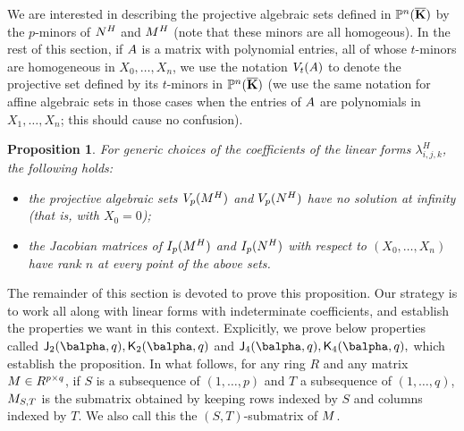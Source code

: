 \documentclass[12pt]{article}
\newtheorem{proposition}[definition]{Proposition}
\begin{document}
We are interested in describing the projective algebraic sets defined
in $\mathbb{P}^n(\overline{\mathbf{K}})$ by the $p$-minors of ${N}^H$ and ${M}^H$ (note that
these minors are all homogeous). In the rest of this section, if ${A}$
is a matrix with polynomial entries, all of whose $t$-minors are
homogeneous in $X_0,\dots,X_n$, we use the notation $V_t({A})$ to
denote the projective set defined by its $t$-minors in $\mathbb{P}^n(\overline{\mathbf{K}})$
(we use the same notation for affine algebraic sets in those cases 
when the entries of ${A}$ are polynomials in $X_1,\dots,X_n$; 
this should cause no confusion).

\begin{proposition}\label{lemma:appendix}
  For generic choices of the coefficients of the linear forms
  $\lambda^H_{i,j,k}$, the following holds:
  \begin{itemize}
  \item the projective algebraic sets $V_p({M}^H)$ and $V_p({N}^H)$
    have no solution at infinity (that is, with $X_0=0$);
  \item the Jacobian matrices of $I_p({M}^H)$ and $I_p({N}^H)$ with
    respect to $(X_0,\dots,X_n)$ have rank $n$ at every point of the
    above sets.
\end{itemize}
\end{proposition}

The remainder of this section is devoted to prove this proposition.
Our strategy is to work all along with linear forms with indeterminate
coefficients, and establish the properties we want in this context.
Explicitly, we prove below properties called $\assI_2(\balpha,q),\assJ_2(\balpha,q)$
and  $\assI_4(\balpha,q),\assJ_4(\balpha,q),$ which establish the proposition.
In what follows, for any ring $R$ and any matrix ${M} \in R^{p\times
  q}$, if $S$ is a subsequence of $(1,\dots,p)$ and $T$ a subsequence
of $(1,\dots,q)$, ${M}_{S,T}$ is the submatrix obtained by keeping
rows indexed by $S$ and columns indexed by $T$. We also call this the
$(S,T)$-submatrix of ${M}$.
\end{document}
